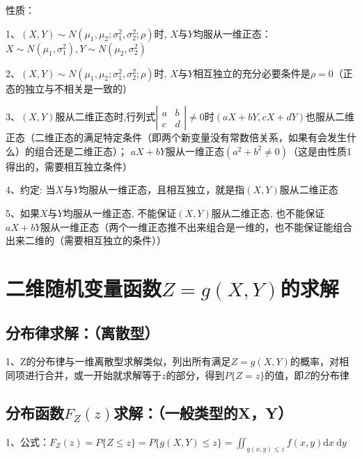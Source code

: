 性质：

1、$\left(X, Y\right) \sim N\left(\mu_{1}, \mu_{2} ; \sigma_{1}^{2}, \sigma_{2}^{2} ; \rho\right)$时, $X$与$Y$均服从一维正态：$X \sim{N}\left(\mu_{1}, \sigma_{1}^{2}\right), Y \sim N\left(\mu_{2}, \sigma_{2}^{2}\right)$

2、$(X, Y) \sim N\left(\mu_{1}, \mu_{2} ; \sigma_{1}^{2}, \sigma_{2}^{2} ; \rho\right)$时, $X$与$Y$相互独立的充分必要条件是$\rho=0$（正态的独立与不相关是一致的）

3、$(X, Y)$服从二维正态时,行列式$\left|\begin{array}{ll}a & b \\ c & d\end{array}\right| \neq 0$时$(a X+b Y, c X+d Y)$也服从二维正态（二维正态的满足特定条件（即两个新变量没有常数倍关系，如果有会发生什么）的组合还是二维正态）； $ a X+b Y$服从一维正态$\left(a^{2}+b^{2} \neq 0\right)$（这是由性质1得出的，需要相互独立条件）

4、约定: 当$X$与$Y$均服从一维正态，且相互独立，就是指$(X, Y)$服从二维正态

5、如果$X$与$Y$均服从一维正态, 不能保证$(X, Y)$服从二维正态, 也不能保证$a X+b Y$服从一维正态（两个一维正态推不出来组合是一维的，也不能保证能组合出来二维的（需要相互独立的条件））

\section{二维随机变量函数$Z=g(X, Y)$的求解}



\subsection{分布律求解：（离散型）}

1、Z的分布律与一维离散型求解类似，列出所有满足$Z=g(X, Y)$的概率，对相同项进行合并，或一开始就求解等于$z$的部分，得到$P\{Z = z\}$的值，即$Z$的分布律



\subsection{分布函数$F_Z(z)$求解：（一般类型的X，Y）}

1、公式：$F_{Z}(z)=P\{Z \leqslant z\}=P\{g(X, Y) \leqslant z\}=\iint_{g(x, y) \leqslant z} f(x, y) \mathrm{d} x \mathrm{~d} y$

